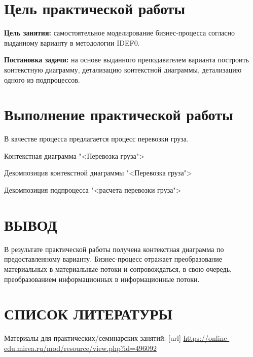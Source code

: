 \graphicspath{{./fifth/img/}}

\section{Цель практической работы}
\textbf{Цель занятия:}
самостоятельное моделирование бизнес-процесса согласно выданному варианту
в методологии IDEF0.\par
\textbf{Постановка задачи:}
на основе выданного преподавателем варианта построить контекстную диаграмму,
детализацию контекстной диаграммы, детализацию одного из подпроцессов.

\section{Выполнение практической работы}
В качестве процесса предлагается процесс перевозки груза.

\begin{image}
	\caption{Контекстная диаграмма "<Перевозка груза">}
	\label{fig:IDEF0:a0}
\end{image}

\begin{image}
	\caption{Декомпозиция контекстной диаграммы "<Перевозка груза">}
	\label{fig:IDEF0:a0:d}
\end{image}

\begin{image}
	\caption{Декомпозиция подпроцесса "<расчета перевозки груза">}
	\label{fig:IDEF0:a2}
\end{image}

\section*{ВЫВОД}
В результате практической работы получена контекстная диаграмма
по предоставленному варианту.
Бизнес-процесс отражает преобразование материальных в
материальные потоки и сопровождаться, в свою очередь, преобразованием
информационных в информационные потоки.

\section*{СПИСОК ЛИТЕРАТУРЫ}
\begin{thebibliography}{}
    \bibitem{}  Материалы для практических/семинарских занятий: [url] 
		\url{https://online-edu.mirea.ru/mod/resource/view.php?id=496092}
\end{thebibliography}
